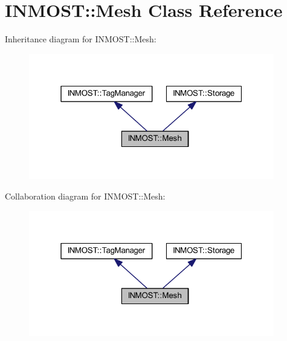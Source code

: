 \hypertarget{classINMOST_1_1Mesh}{\section{I\-N\-M\-O\-S\-T\-:\-:Mesh Class Reference}
\label{classINMOST_1_1Mesh}
}


Inheritance diagram for I\-N\-M\-O\-S\-T\-:\-:Mesh\-:\nopagebreak
\begin{figure}[H]
\begin{center}
\leavevmode
\includegraphics[width=304pt]{classINMOST_1_1Mesh__inherit__graph}
\end{center}
\end{figure}


Collaboration diagram for I\-N\-M\-O\-S\-T\-:\-:Mesh\-:\nopagebreak
\begin{figure}[H]
\begin{center}
\leavevmode
\includegraphics[width=304pt]{classINMOST_1_1Mesh__coll__graph}
\end{center}
\end{figure}
